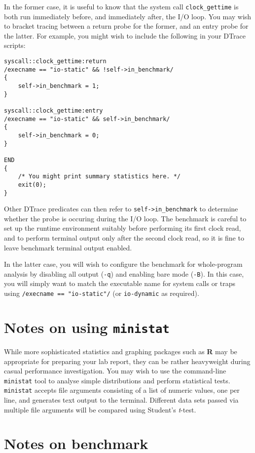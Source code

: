 \documentclass[a4paper,10pt]{article}
\begin{document}
In the former case, it is useful to know that the system call
\texttt{clock\_gettime} is both run immediately before, and immediately after,
the I/O loop.
You may wish to bracket tracing between a return probe for the former, and an
entry probe for the latter.
For example, you might wish to include the following in your DTrace scripts:

\begin{verbatim}
syscall::clock_gettime:return
/execname == "io-static" && !self->in_benchmark/
{
    self->in_benchmark = 1;
}

syscall::clock_gettime:entry
/execname == "io-static" && self->in_benchmark/
{
    self->in_benchmark = 0;
}

END
{
    /* You might print summary statistics here. */
    exit(0);
}
\end{verbatim}

\noindent
Other DTrace predicates can then refer to \texttt{self->in\_benchmark} to
determine whether the probe is occuring during the I/O loop.
The benchmark is careful to set up the runtime environment suitably before
performing its first clock read, and to perform terminal output only after the
second clock read, so it is fine to leave benchmark terminal output enabled.

In the latter case, you will wish to configure the benchmark for whole-program
analysis by disabling all output (\texttt{-q}) and enabling bare mode
(\texttt{-B}).
In this case, you will simply want to match the executable name for system
calls or traps using \texttt{/execname == "io-static"/} (or
\texttt{io-dynamic} as required).

\section*{Notes on using \texttt{ministat}}

While more sophisticated statistics and graphing packages such as \textbf{R}
may be appropriate for preparing your lab report, they can be rather
heavyweight during casual performance investigation.
You may wish to use the command-line \texttt{ministat} tool to analyse simple
distributions and perform statistical tests.
\texttt{ministat} accepts file arguments consisting of a list of numeric
values, one per line, and generates text output to the terminal.
Different data sets passed via multiple file arguments will be compared using
Student's \textit{t}-test.

\section*{Notes on benchmark}
\end{document}
